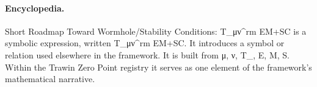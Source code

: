 \paragraph{Encyclopedia.}
Short Roadmap Toward Wormhole/Stability Conditions: T\_μν\textasciicircum{}rm EM+SC is a symbolic expression, written T\_μν\textasciicircum{}rm EM+SC. It introduces a symbol or relation used elsewhere in the framework. It is built from μ, ν, T\_, E, M, S. Within the Trawin Zero Point registry it serves as one element of the framework's mathematical narrative.
